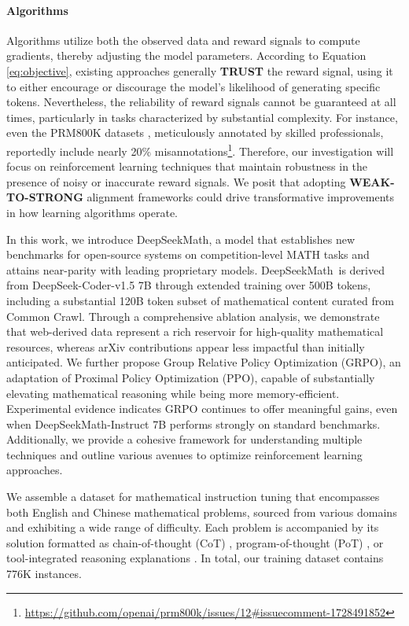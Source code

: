\begin{itemize}[topsep=0pt]
\paragraph{Algorithms} Algorithms utilize both the observed data and reward signals to compute gradients, thereby adjusting the model parameters. According to Equation \ref{eq:objective}, existing approaches generally \textbf{TRUST} the reward signal, using it to either encourage or discourage the model's likelihood of generating specific tokens. Nevertheless, the reliability of reward signals cannot be guaranteed at all times, particularly in tasks characterized by substantial complexity. For instance, even the PRM800K datasets \citep{lightman2023let}, meticulously annotated by skilled professionals, reportedly include nearly 20\% misannotations\footnote{\url{https://github.com/openai/prm800k/issues/12\#issuecomment-1728491852}}. Therefore, our investigation will focus on reinforcement learning techniques that maintain robustness in the presence of noisy or inaccurate reward signals. We posit that adopting \textbf{WEAK-TO-STRONG} alignment frameworks \citep{burns2023weak} could drive transformative improvements in how learning algorithms operate.

In this work, we introduce DeepSeekMath, a model that establishes new benchmarks for open-source systems on competition-level MATH tasks and attains near-parity with leading proprietary models. DeepSeekMath~is derived from DeepSeek-Coder-v1.5 7B through extended training over 500B tokens, including a substantial 120B token subset of mathematical content curated from Common Crawl. Through a comprehensive ablation analysis, we demonstrate that web-derived data represent a rich reservoir for high-quality mathematical resources, whereas arXiv contributions appear less impactful than initially anticipated. We further propose Group Relative Policy Optimization (GRPO), an adaptation of Proximal Policy Optimization (PPO), capable of substantially elevating mathematical reasoning while being more memory-efficient. Experimental evidence indicates GRPO continues to offer meaningful gains, even when DeepSeekMath-Instruct 7B performs strongly on standard benchmarks. Additionally, we provide a cohesive framework for understanding multiple techniques and outline various avenues to optimize reinforcement learning approaches.

We assemble a dataset for mathematical instruction tuning that encompasses both English and Chinese mathematical problems, sourced from various domains and exhibiting a wide range of difficulty. Each problem is accompanied by its solution formatted as chain-of-thought (CoT) \citep{cot}, program-of-thought (PoT) \citep{pot,pal}, or tool-integrated reasoning explanations \citep{tora}. In total, our training dataset contains 776K instances.


\end{itemize}
